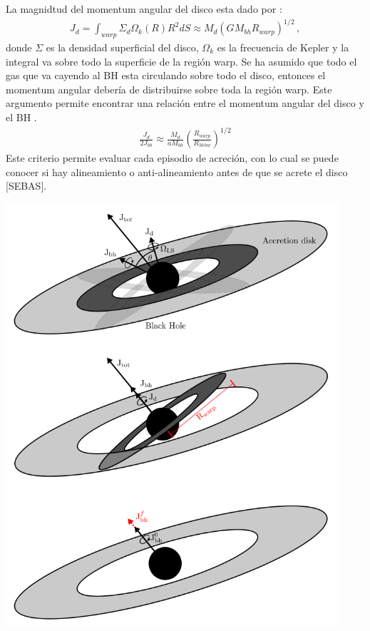 La magnidtud del momentum angular del disco esta dado por \cite{Bustamante2018b}:
%
\begin{align}
    J_{d}=\int_{warp} \Sigma_{d}\Omega_{k}(R)R^{2}dS \approx M_{d}(GM_{bh}R_{warp})^{1/2}\,,
    \label{eq: magnitid J_disco}
\end{align}
%
donde $\Sigma$ es la densidad superficial del disco, $\Omega_{k}$ es la frecuencia de Kepler y la integral va sobre todo la superficie de la región warp. Se ha asumido que todo el gas que va cayendo al BH esta circulando sobre todo el disco, entonces el momentum angular debería de distribuirse sobre toda la región warp. Este argumento permite encontrar una relación entre el momentum angular del disco y el BH \cite{king2005}.
%
\begin{align}
    \frac{J_{d}}{2J_{bh}}\approx \frac{M_{d}}{aM_{bh}}\left(\frac{R_{warp}}{R_{Schw}} \right)^{1/2}
\end{align}
%
Este criterio permite evaluar cada episodio de acreción, con lo cual se puede conocer si hay alineamiento o anti-alineamiento antes de que se acrete el disco [SEBAS]. 

\begin{center}
\includegraphics[scale=.5]{./figures/4_Modelo_Spin/evolucion_spin.png}
\label{fig: evolucion espin}
\end{center}


